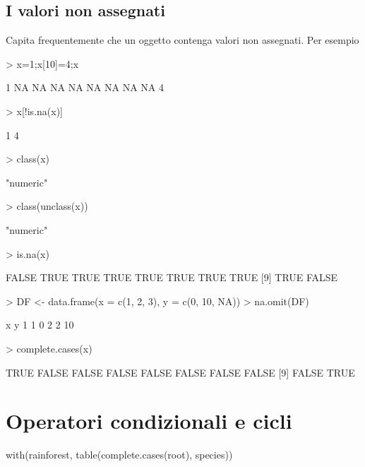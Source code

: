 \documentclass[onecolumn,11pt]{book}
\begin{document}
\subsection{I valori non assegnati}
Capita frequentemente che un oggetto contenga valori non assegnati.
Per esempio
\begin{Schunk}
\begin{Sinput}
> x=1;x[10]=4;x
\end{Sinput}
\begin{Soutput}
 [1]  1 NA NA NA NA NA NA NA NA  4
\end{Soutput}
\end{Schunk}
\begin{Schunk}
\begin{Sinput}
> x[!is.na(x)]
\end{Sinput}
\begin{Soutput}
[1] 1 4
\end{Soutput}
\begin{Sinput}
> class(x)
\end{Sinput}
\begin{Soutput}
[1] "numeric"
\end{Soutput}
\begin{Sinput}
> class(unclass(x))
\end{Sinput}
\begin{Soutput}
[1] "numeric"
\end{Soutput}
\begin{Sinput}
> is.na(x)
\end{Sinput}
\begin{Soutput}
 [1] FALSE  TRUE  TRUE  TRUE  TRUE  TRUE  TRUE  TRUE
 [9]  TRUE FALSE
\end{Soutput}
\begin{Sinput}
>  DF <- data.frame(x = c(1, 2, 3), y = c(0, 10, NA))
> na.omit(DF)
\end{Sinput}
\begin{Soutput}
  x  y
1 1  0
2 2 10
\end{Soutput}
\begin{Sinput}
> complete.cases(x)
\end{Sinput}
\begin{Soutput}
 [1]  TRUE FALSE FALSE FALSE FALSE FALSE FALSE FALSE
 [9] FALSE  TRUE
\end{Soutput}
\end{Schunk}
\section{Operatori condizionali e cicli}
with(rainforest, table(complete.cases(root), species))
\end{document}
